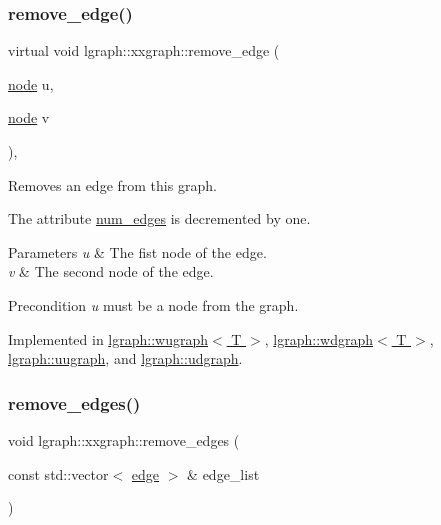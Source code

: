 \subsubsection{\texorpdfstring{remove\+\_\+edge()}{remove\_edge()}\hspace{0.1cm}{\footnotesize\ttfamily [2/2]}}
{\footnotesize\ttfamily virtual void lgraph\+::xxgraph\+::remove\+\_\+edge (\begin{DoxyParamCaption}\item[{\hyperlink{namespacelgraph_a397169dd66adf725210a30fb7251773e}{node}}]{u,  }\item[{\hyperlink{namespacelgraph_a397169dd66adf725210a30fb7251773e}{node}}]{v }\end{DoxyParamCaption})\hspace{0.3cm}{\ttfamily [pure virtual]}, {\ttfamily [inherited]}}



Removes an edge from this graph. 

The attribute \hyperlink{classlgraph_1_1xxgraph_a6765a9a3be42f6e0f824635c593b35d7}{num\+\_\+edges} is decremented by one. 
\begin{DoxyParams}{Parameters}
{\em u} & The fist node of the edge. \\
\hline
{\em v} & The second node of the edge. \\
\hline
\end{DoxyParams}
\begin{DoxyPrecond}{Precondition}
{\itshape u} must be a node from the graph. 
\end{DoxyPrecond}


Implemented in \hyperlink{classlgraph_1_1wugraph_a3debc0be0d08b7cfcbe942aadbe81e1f}{lgraph\+::wugraph$<$ T $>$}, \hyperlink{classlgraph_1_1wdgraph_a6bdc75a07568928bc179dde03a814366}{lgraph\+::wdgraph$<$ T $>$}, \hyperlink{classlgraph_1_1uugraph_ae38adf44fd8f44d7f940710a0f8f3b35}{lgraph\+::uugraph}, and \hyperlink{classlgraph_1_1udgraph_af1225a134bea314254c03e18a18a41d2}{lgraph\+::udgraph}.

\mbox{\label{classlgraph_1_1xxgraph_aef7c4bf62f3f4db362b2d3accb3b6d3d}} 
\subsubsection{\texorpdfstring{remove\+\_\+edges()}{remove\_edges()}}
{\footnotesize\ttfamily void lgraph\+::xxgraph\+::remove\+\_\+edges (\begin{DoxyParamCaption}\item[{const std\+::vector$<$ \hyperlink{namespacelgraph_a76bd7d50719f03de7a85db259d80d572}{edge} $>$ \&}]{edge\+\_\+list }\end{DoxyParamCaption})\hspace{0.3cm}{\ttfamily [inherited]}}



